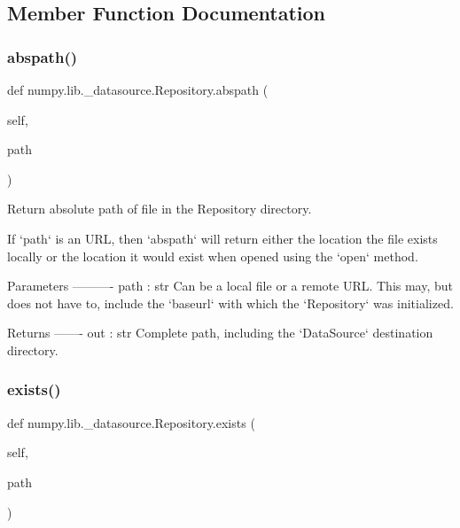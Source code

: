 \subsection{Member Function Documentation}
\mbox{\label{classnumpy_1_1lib_1_1__datasource_1_1Repository_a8535769f09538e2a46e2417ac36e1dfc}} 
\subsubsection{\texorpdfstring{abspath()}{abspath()}}
{\footnotesize\ttfamily def numpy.\+lib.\+\_\+datasource.\+Repository.\+abspath (\begin{DoxyParamCaption}\item[{}]{self,  }\item[{}]{path }\end{DoxyParamCaption})}

\begin{DoxyVerb}Return absolute path of file in the Repository directory.

If `path` is an URL, then `abspath` will return either the location
the file exists locally or the location it would exist when opened
using the `open` method.

Parameters
----------
path : str
    Can be a local file or a remote URL. This may, but does not
    have to, include the `baseurl` with which the `Repository` was
    initialized.

Returns
-------
out : str
    Complete path, including the `DataSource` destination directory.\end{DoxyVerb}
 \mbox{\label{classnumpy_1_1lib_1_1__datasource_1_1Repository_aa3c775ac9ca505033fcaa34327f3e81b}} 
\subsubsection{\texorpdfstring{exists()}{exists()}}
{\footnotesize\ttfamily def numpy.\+lib.\+\_\+datasource.\+Repository.\+exists (\begin{DoxyParamCaption}\item[{}]{self,  }\item[{}]{path }\end{DoxyParamCaption})}


